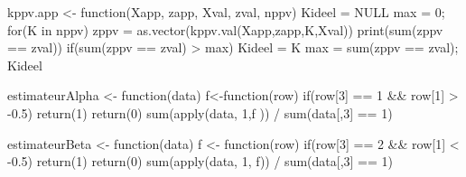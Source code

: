 \documentclass[a4paper,11pt]{article}
\begin{document}

      \begin{code}
      kppv.app <- function(Xapp, zapp, Xval, zval, nppv)
      {
        Kideel = NULL
        max = 0;
        for(K in nppv){
          zppv = as.vector(kppv.val(Xapp,zapp,K,Xval))
          print(sum(zppv == zval))
          if(sum(zppv == zval) > max){
            Kideel = K
            max = sum(zppv == zval);
          }
        }
        Kideel
      }
      \end{code}
      
      \begin{code}
      estimateurAlpha <- function(data){
        f<-function(row) {
          if(row[3] == 1 && row[1] > -0.5){ 
            return(1) 
          } 
          return(0) 
        }
        sum(apply(data, 1,f )) / sum(data[,3] == 1)
      }
      
      estimateurBeta <- function(data){
        f <- function(row) {
          if(row[3] == 2 && row[1] < -0.5){ 
            return(1) 
          } 
          return(0) 
        }
        sum(apply(data, 1, f)) / sum(data[,3] == 1)
      }
      \end{code}
\end{document}
